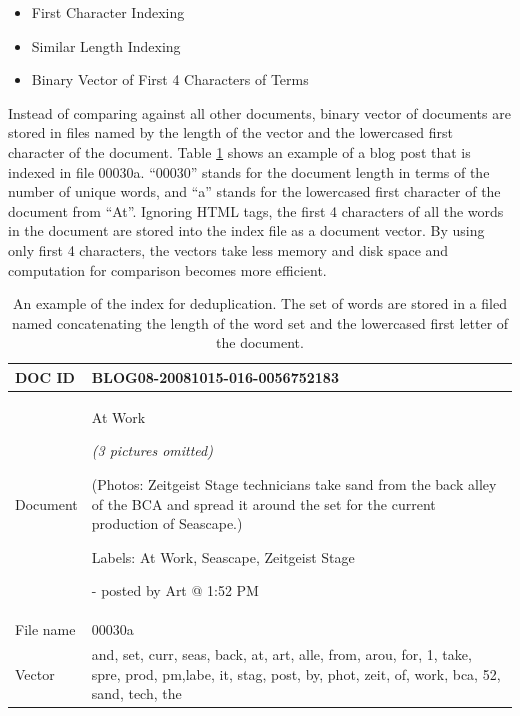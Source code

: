 \documentclass{sig-alternate}
\begin{document}
\begin{itemize}
\item First Character Indexing
\item Similar Length Indexing
\item Binary Vector of First 4 Characters of Terms
\end{itemize}

Instead of comparing against all other documents, binary vector of documents are stored in files named by the length of the vector and the lowercased first character of the document. Table \ref{table:dedup} shows an example of a blog post that is indexed in file 00030a. ``00030'' stands for the document length in terms of the number of unique words, and ``a'' stands for the lowercased first character of the document from ``At''. Ignoring HTML tags, the first 4 characters of all the words in the document are stored into the index file as a document vector. By using only first 4 characters, the vectors take less memory and disk space and computation for comparison becomes more efficient.


\begin{table}[h!t!]
\begin{center}
\begin{tabular}{l|p{6.0cm}}

\hline
DOC ID & BLOG08-20081015-016-0056752183\\ 

\hline
Document & 

At Work


\emph{(3 pictures omitted)}



(Photos: Zeitgeist Stage technicians take sand from the back alley of the BCA and spread it around the set for the current production of Seascape.)

Labels: At Work, Seascape, Zeitgeist Stage


- posted by Art @ 1:52 PM\\
\hline
File name& 00030a\\
\hline
Vector & and, set, curr, seas, back, at, art, alle, from, arou, for, 1, take, spre, prod, pm,labe, it, stag, post, by, phot, zeit, of, work, bca, 52, sand, tech, the\\

\hline
\end{tabular}
\caption{An example of the index for deduplication. The set of words are stored in a filed named concatenating the length of the word set and the lowercased first letter of the document.}
\label{table:dedup}
\end{center}
\end{table}
\end{document}
